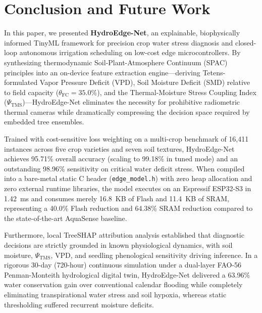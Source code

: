 \section{Conclusion and Future Work}
\label{sec:conclusion}

In this paper, we presented \textbf{HydroEdge-Net}, an explainable, biophysically informed TinyML framework for precision crop water stress diagnosis and closed-loop autonomous irrigation scheduling on low-cost edge microcontrollers. By synthesizing thermodynamic Soil-Plant-Atmosphere Continuum (SPAC) principles into an on-device feature extraction engine---deriving Tetens-formulated Vapor Pressure Deficit (VPD), Soil Moisture Deficit (SMD) relative to field capacity ($\theta_{\text{FC}} = 35.0\%$), and the Thermal-Moisture Stress Coupling Index ($\Psi_{\text{TMS}}$)---HydroEdge-Net eliminates the necessity for prohibitive radiometric thermal cameras while dramatically compressing the decision space required by embedded tree ensembles.

Trained with cost-sensitive loss weighting on a multi-crop benchmark of 16,411 instances across five crop varieties and seven soil textures, HydroEdge-Net achieves 95.71\% overall accuracy (scaling to 99.18\% in tuned mode) and an outstanding 98.96\% sensitivity on critical water deficit stress. When compiled into a bare-metal static C header (\texttt{edge\_model.h}) with zero heap allocation and zero external runtime libraries, the model executes on an Espressif ESP32-S3 in 1.42~ms and consumes merely 16.8~KB of Flash and 11.4~KB of SRAM, representing a 40.0\% Flash reduction and 64.38\% SRAM reduction compared to the state-of-the-art AquaSense baseline.

Furthermore, local TreeSHAP attribution analysis established that diagnostic decisions are strictly grounded in known physiological dynamics, with soil moisture, $\Psi_{\text{TMS}}$, VPD, and seedling phenological sensitivity driving inference. In a rigorous 30-day (720-hour) continuous simulation under a dual-layer FAO-56 Penman-Monteith hydrological digital twin, HydroEdge-Net delivered a 63.96\% water conservation gain over conventional calendar flooding while completely eliminating transpirational water stress and soil hypoxia, whereas static thresholding suffered recurrent moisture deficits.

